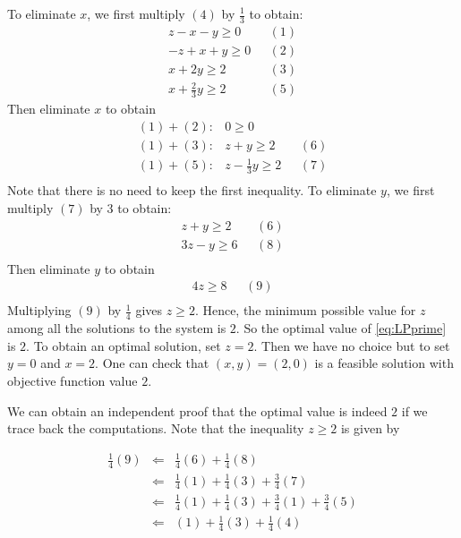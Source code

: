 \documentclass[]{book}
\theoremstyle{definition}
\theoremstyle{definition}
\theoremstyle{remark}
\begin{document}
To eliminate \(x\), we first multiply \((4)\) by \(\frac{1}{3}\) to
obtain: \[
\begin{array}{rl}
 z - x - y \geq 0 & ~~~(1) \\
-z + x + y \geq 0 & ~~~(2) \\
 x + 2y  \geq 2 &~~~(3)\\
 x + \frac{2}{3}y  \geq 2 & ~~~(5)
\end{array}
\] Then eliminate \(x\) to obtain \[
\begin{array}{rrl}
(1) + (2):  & 0 \geq 0 \\
(1) + (3):  & z + y \geq 2 & ~~~(6) \\
(1) + (5):  & z - \frac{1}{3} y \geq 2 & ~~~(7) \\
\end{array}
\] Note that there is no need to keep the first inequality. To eliminate
\(y\), we first multiply \((7)\) by \(3\) to obtain: \[
\begin{array}{rl}
  z + y \geq 2 & ~~~(6) \\
  3z - y \geq 6 & ~~~(8) \\
\end{array}
\] Then eliminate \(y\) to obtain \[
\begin{array}{rl}
  4z \geq 8 & ~~~(9) \\
\end{array}
\] Multiplying \((9)\) by \(\frac{1}{4}\) gives \(z \geq 2\). Hence, the
minimum possible value for \(z\) among all the solutions to the system
is \(2\). So the optimal value of \eqref{eq:LPprime} is \(2\). To obtain
an optimal solution, set \(z = 2\). Then we have no choice but to set
\(y = 0\) and \(x = 2\). One can check that \((x,y) = (2,0)\) is a
feasible solution with objective function value \(2\).

We can obtain an independent proof that the optimal value is indeed
\(2\) if we trace back the computations. Note that the inequality
\(z \geq 2\) is given by

\begin{eqnarray*}
\frac{1}{4} (9) 
& \Leftarrow & \frac{1}{4} (6) + \frac{1}{4} (8) \\
& \Leftarrow & \frac{1}{4} (1)+\frac{1}{4}(3) + \frac{3}{4}(7) \\
& \Leftarrow & \frac{1}{4} (1)+\frac{1}{4}(3) + \frac{3}{4}(1)+\frac{3}{4}(5) \\
& \Leftarrow & (1)+ \frac{1}{4}(3) + \frac{1}{4} (4)  \\
\end{eqnarray*}
\end{document}
